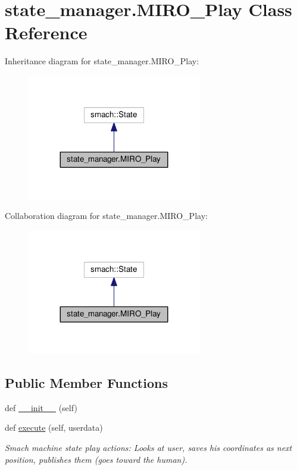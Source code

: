 \hypertarget{classstate__manager_1_1MIRO__Play}{}\section{state\+\_\+manager.\+M\+I\+R\+O\+\_\+\+Play Class Reference}
\label{classstate__manager_1_1MIRO__Play}


Inheritance diagram for state\+\_\+manager.\+M\+I\+R\+O\+\_\+\+Play\+:\nopagebreak
\begin{figure}[H]
\begin{center}
\leavevmode
\includegraphics[width=215pt]{classstate__manager_1_1MIRO__Play__inherit__graph}
\end{center}
\end{figure}


Collaboration diagram for state\+\_\+manager.\+M\+I\+R\+O\+\_\+\+Play\+:\nopagebreak
\begin{figure}[H]
\begin{center}
\leavevmode
\includegraphics[width=215pt]{classstate__manager_1_1MIRO__Play__coll__graph}
\end{center}
\end{figure}
\subsection*{Public Member Functions}
\begin{DoxyCompactItemize}
\item 
def \hyperlink{classstate__manager_1_1MIRO__Play_a863ae1958460cf6bf33faaba597fc5a2}{\+\_\+\+\_\+init\+\_\+\+\_\+} (self)
\item 
def \hyperlink{classstate__manager_1_1MIRO__Play_a781db4be4fcbb313c46097a8fdf06275}{execute} (self, userdata)
\begin{DoxyCompactList}\small\item\em Smach machine state play actions\+: Looks at user, saves his coordinates as next position, publishes them (goes toward the human). \end{DoxyCompactList}\end{DoxyCompactItemize}


